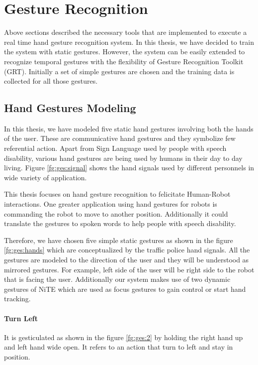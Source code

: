 \section{Gesture Recognition} Above sections described the necessary tools that are implemented to execute a real time hand gesture recognition system. In this thesis, we have decided to train the system with static gestures. However, the system can be easily extended to recognize temporal gestures with the flexibility of Gesture Recognition Toolkit (GRT). Initially a set of simple gestures are chosen and the training data is collected for all those gestures.

\subsection{Hand Gestures Modeling} In this thesis, we have modeled five static hand gestures involving both the hands of the user. These are communicative hand gestures and they symbolize few referential action. Apart from Sign Language used by people with speech disability, various hand gestures are being used by humans in their day to day living. Figure \ref{fg:ges:signal} shows the hand signals used by different personnels in wide variety of application.



This thesis focuses on hand gesture recognition to felicitate Human-Robot interactions. One greater application using hand gestures for robots is commanding the robot to move to another position. Additionally it could translate the gestures to spoken words to help people with speech disability. 



Therefore, we have chosen five simple static gestures as shown in the figure \ref{fg:ges:hands} which are conceptualized by the traffic police hand signals. All the gestures are modeled to the direction of the user and they will be understood as mirrored gestures. For example, left side of the user will be right side to the robot that is facing the user. Additionally our system makes use of two dynamic gestures of NiTE which are used as focus gestures to gain control or start hand tracking.

\paragraph*{Turn Left} It is gesticulated as shown in the figure \ref{fg:ges:2} by holding the right hand up and left hand wide open. It refers to an action that turn to left and stay in position. 

